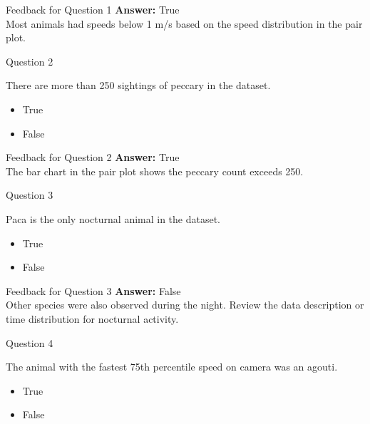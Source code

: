 \documentclass[
  ignorenonframetext,
]{beamer}
\providecommand{\tightlist}{%
  \setlength{\itemsep}{0pt}\setlength{\parskip}{0pt}}
\begin{document}
\begin{frame}{Feedback for Question 1}
\label{feedback-for-question-1}
\textbf{Answer:} True\\
Most animals had speeds below 1 m/s based on the speed distribution in
the pair plot.
\end{frame}

\begin{frame}{Question 2}
\label{question-2-1}
\begin{block}{There are more than 250 sightings of peccary in the
dataset.}
\label{there-are-more-than-250-sightings-of-peccary-in-the-dataset.}
\begin{itemize}
\tightlist
\item
  True
\item
  False
\end{itemize}
\end{block}
\end{frame}

\begin{frame}{Feedback for Question 2}
\label{feedback-for-question-2}
\textbf{Answer:} True\\
The bar chart in the pair plot shows the peccary count exceeds 250.
\end{frame}

\begin{frame}{Question 3}
\label{question-3-1}
\begin{block}{Paca is the only nocturnal animal in the dataset.}
\label{paca-is-the-only-nocturnal-animal-in-the-dataset.}
\begin{itemize}
\tightlist
\item
  True
\item
  False
\end{itemize}
\end{block}
\end{frame}

\begin{frame}{Feedback for Question 3}
\label{feedback-for-question-3}
\textbf{Answer:} False\\
Other species were also observed during the night. Review the data
description or time distribution for nocturnal activity.
\end{frame}

\begin{frame}{Question 4}
\label{question-4-1}
\begin{block}{The animal with the fastest 75th percentile speed on
camera was an agouti.}
\label{the-animal-with-the-fastest-75th-percentile-speed-on-camera-was-an-agouti.}
\begin{itemize}
\tightlist
\item
  True
\item
  False
\end{itemize}
\end{block}
\end{frame}
\end{document}
